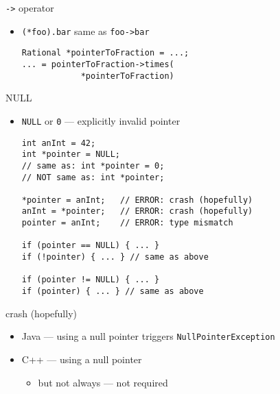 

\begin{frame}[fragile,label=arrowOp]{\texttt{-\textgreater} operator}
\lstset{
    language=C++,
    style=small
}
    \begin{itemize}
        \item \lstinline|(*foo).bar| same as \lstinline|foo->bar|
\begin{lstlisting}
Rational *pointerToFraction = ...;
... = pointerToFraction->times(
            *pointerToFraction)
\end{lstlisting}
    \end{itemize}
\end{frame}


\begin{frame}[fragile,label=NULL]{NULL}
\lstset{language=C++,style=smaller}
    \begin{itemize}
    \item \verb|NULL| or \verb|0| --- explicitly invalid pointer
\begin{lstlisting}
int anInt = 42;
int *pointer = NULL;
// same as: int *pointer = 0;
// NOT same as: int *pointer;

*pointer = anInt;   // ERROR: crash (hopefully)
anInt = *pointer;   // ERROR: crash (hopefully)
pointer = anInt;    // ERROR: type mismatch

if (pointer == NULL) { ... }
if (!pointer) { ... } // same as above

if (pointer != NULL) { ... }
if (pointer) { ... } // same as above
\end{lstlisting}
    \end{itemize}
\end{frame}

\begin{frame}[fragile,label=NullErrors]{crash (hopefully)}
\lstset{language=C++,style=small}
    \begin{itemize}
        \item Java --- using a null pointer triggers \texttt{NullPointerException}
        \item C++ --- using a null pointer 
            \begin{itemize}
            \item but not always --- not required
            \end{itemize}
    \end{itemize}
\end{frame}

